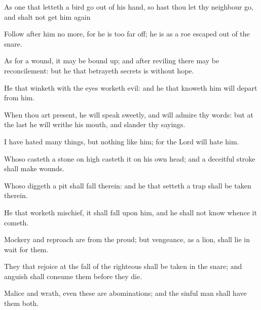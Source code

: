 {\par }{\PP {}As one that letteth a bird go out of his hand, so hast thou let thy neighbour go, and shalt not get him again
\par }{\PP {}Follow after him no more, for he is too far off; he is as a roe escaped out of the snare.
\par }{\PP {}As for a wound, it may be bound up; and after reviling there may be reconcilement: but he that betrayeth secrets is without hope.
\par }{\PP {}He that winketh with the eyes worketh evil: and he that knoweth him will depart from him.
\par }{\PP {}When thou art present, he will speak sweetly, and will admire thy words: but at the last he will writhe his mouth, and slander thy sayings.
\par }{\PP {}I have hated many things, but nothing like him; for the Lord will hate him.
\par }{\PP {}Whoso casteth a stone on high casteth it on his own head; and a deceitful stroke shall make wounds.
\par }{\PP {}Whoso diggeth a pit shall fall therein: and he that setteth a trap shall be taken therein.
\par }{\PP {}He that worketh mischief, it shall fall upon him, and he shall not know whence it cometh.
\par }{\PP {}Mockery and reproach are from the proud; but vengeance, as a lion, shall lie in wait for them.
\par }{\PP {}They that rejoice at the fall of the righteous shall be taken in the snare; and anguish shall consume them before they die.
\par }{\PP {}Malice and wrath, even these are abominations; and the sinful man shall have them both.

}
